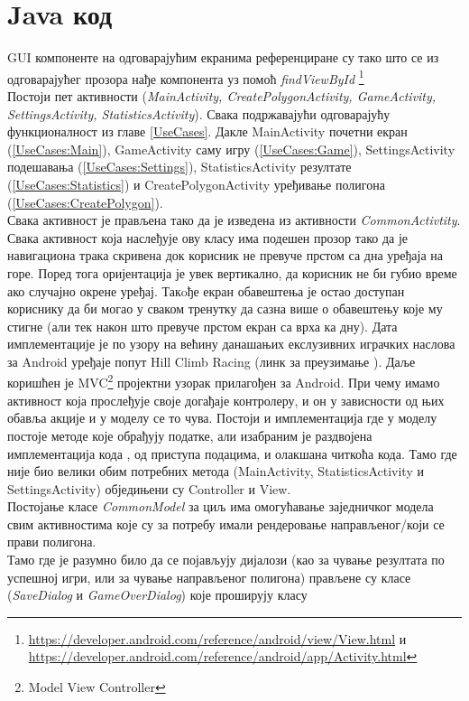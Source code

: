 \section{Java код}
GUI компоненте на одговарајућим екранима референциране су тако што се из одговарајућег прозора нађе компонента уз помоћ \emph{findViewById} \footnote{\url{https://developer.android.com/reference/android/view/View.html} и \url{https://developer.android.com/reference/android/app/Activity.html}}
\\ \indent 
Постоји пет активности (\emph{MainActivity, CreatePolygonActivity, GameActivity, SettingsActivity, StatisticsActivity}). Свака подржавајући одговарајућу функционалност из главе \ref{UseCases}. Дакле MainActivity почетни екран (\ref{UseCases:Main}), GameActivity  саму игру (\ref{UseCases:Game}), SettingsActivity подешавања (\ref{UseCases:Settings}), StatisticsActivity резултате (\ref{UseCases:Statistics}) и CreatePolygonActivity уређивање полигона (\ref{UseCases:CreatePolygon}).
\\ \indent 
Свака активност је прављена тако да је изведена из активности \emph{CommonActivtity}. Свака активност која наслеђује ову класу има подешен прозор тако да је навигациона трака скривена док корисник не превуче прстом са дна уређаја на горе. Поред тога оријентација је увек вертикално, да корисник не би губио време ако случајно окрене уређај. Такoђе екран обавештења је остао доступан кориснику да би могао у сваком тренутку да сазна више о обавештењу које му стигне (али тек након што превуче прстом екран са врха ка дну).
 Дата имплементације је по узору на већину данашањих екслузивних играчких наслова за Android уређаје попут Hill Climb Racing (линк за преузимање \cite{HillCR}). Даље коришћен је MVC\footnote{Model View Controller} пројектни узорак прилагођен за Android. При чему имамо активност која прослеђује своје догађаје контролеру, и он у зависности од њих обавља акције и у моделу се то чува. Постоји и имплементација где у моделу постоје методе које обрађују податке, али изабраним је раздвојена имплементација кода , од приступа подацима, и олакшана читкоћа кода.  Тамо где није био велики обим потребних метода (MainActivity, StatisticsActivity и SettingsActivity) обједињени су Controller и View. 
 \\ \indent
 Постојање класе \emph{CommonModel} за циљ има омогућавање заједничког модела свим активностима које су за потребу имали рендеровање направљеног/који се прави полигона. 
 \\ \indent
 Тамо где је разумно било да се појављују дијалози (као за чување резултата по успешној игри, или за чување направљеног полигона) прављене су класе (\emph{SaveDialog} и \emph{GameOverDialog}) које проширују класу 
